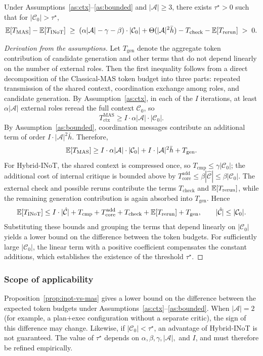 \begin{proposition}\label{prop:inot-vs-mas}
Under Assumptions~\ref{as:ctx}--\ref{as:bounded} and $|\mathcal{A}|\ge 3$, there exists $\tau^\star>0$ such that for $|\mathcal{C}_0|>\tau^\star$,
\[
\mathbb{E}[T_{\text{MAS}}]-\mathbb{E}[T_{\text{INoT}}]\;\ge\;(\alpha|\mathcal{A}|-\gamma-\beta)\cdot|\mathcal{C}_0|+\Theta(|\mathcal{A}|^2\bar{h})-T_{\text{check}}-\mathbb{E}[T_{\text{rerun}}]\;>\;0.
\]
\end{proposition}

\begin{proof}[Derivation from the assumptions]
Let $T_{\text{gen}}$ denote the aggregate token contribution of candidate generation and other terms that do not depend linearly on the number of external roles. Then the first inequality follows from a direct decomposition of the \textrm{Classical-MAS} token budget into three parts: repeated transmission of the shared context, coordination exchange among roles, and candidate generation. By Assumption~\ref{as:ctx}, in each of the $I$ iterations, at least $\alpha|\mathcal{A}|$ external roles reread the full context $\mathcal{C}_0$, so
\[
T_{\text{ctx}}^{\text{MAS}}\ge I\cdot\alpha|\mathcal{A}|\cdot|\mathcal{C}_0|.
\]
By Assumption~\ref{as:bounded}, coordination messages contribute an additional term of order $I\cdot|\mathcal{A}|^2\bar{h}$. Therefore,
\[
\mathbb{E}[T_{\text{MAS}}]\ge I\cdot\alpha|\mathcal{A}|\cdot|\mathcal{C}_0|+I\cdot|\mathcal{A}|^2\bar{h}+T_{\text{gen}}.
\]
For \textrm{Hybrid-INoT}, the shared context is compressed once, so $T_{\text{cmp}}\le\gamma|\mathcal{C}_0|$; the additional cost of internal critique is bounded above by $T_{\text{core}}^{\text{add}}\le\beta|\hat{\mathcal{C}}|\le\beta|\mathcal{C}_0|$. The external check and possible reruns contribute the terms $T_{\text{check}}$ and $\mathbb{E}[T_{\text{rerun}}]$, while the remaining generation contribution is again absorbed into $T_{\text{gen}}$. Hence
\[
\mathbb{E}[T_{\text{INoT}}]\le I\cdot|\hat{\mathcal{C}}|+T_{\text{cmp}}+T_{\text{core}}^{\text{add}}+T_{\text{check}}+\mathbb{E}[T_{\text{rerun}}]+T_{\text{gen}},
\qquad |\hat{\mathcal{C}}|\le|\mathcal{C}_0|.
\]
Substituting these bounds and grouping the terms that depend linearly on $|\mathcal{C}_0|$ yields a lower bound on the difference between the token budgets. For sufficiently large $|\mathcal{C}_0|$, the linear term with a positive coefficient compensates the constant additions, which establishes the existence of the threshold $\tau^\star$.
\end{proof}

\subsubsection*{Scope of applicability}
Proposition~\ref{prop:inot-vs-mas} gives a lower bound on the difference between the expected token budgets under Assumptions~\ref{as:ctx}--\ref{as:bounded}. When $|\mathcal{A}|=2$ (for example, a plan+exec configuration without a separate critic), the sign of this difference may change. Likewise, if $|\mathcal{C}_0|<\tau^\star$, an advantage of \textrm{Hybrid-INoT} is not guaranteed. The value of $\tau^\star$ depends on $\alpha,\beta,\gamma,|\mathcal{A}|,$ and $I$, and must therefore be refined empirically.

